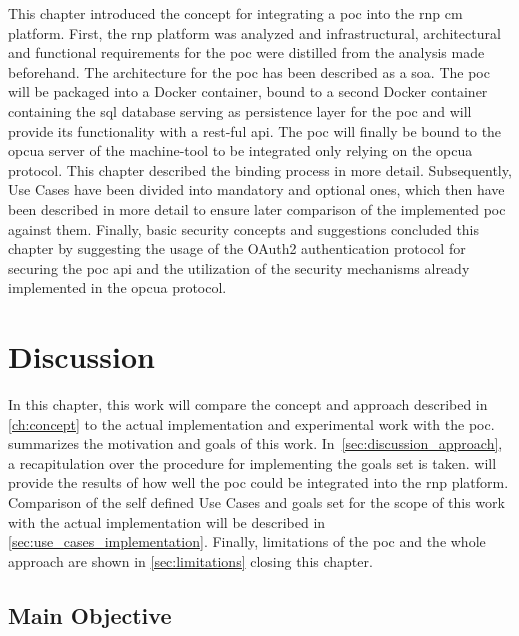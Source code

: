 \documentclass[
a4paper,
twoside,
headsepline,
cleardoublepage=empty,
parskip=half,
draft=false
]{scrbook}
\begin{document}
			This chapter introduced the concept for integrating a \gls{poc} into the \gls{rnp} \gls{cm} platform.
			First, the \gls{rnp} platform was analyzed and infrastructural, architectural and functional requirements for the \gls{poc} were distilled from the analysis made beforehand. 
			The architecture for the \gls{poc} has been described as a \gls{soa}.
			The \gls{poc} will be packaged into a Docker container, bound to a second Docker container containing the \gls{sql} database serving as persistence layer for the \gls{poc} and will provide its functionality with a \gls{rest}-ful \gls{api}.
			The \gls{poc} will finally be bound to the \gls{opcua} server of the machine-tool to be integrated only relying on the \gls{opcua} protocol.
			This chapter described the binding process in more detail.
			Subsequently, Use Cases have been divided into mandatory and optional ones, which then have been described in more detail to ensure later comparison of the implemented \gls{poc} against them.
			Finally, basic security concepts and suggestions concluded this chapter by suggesting the usage of the OAuth2 authentication protocol for securing the \gls{poc} \gls{api} and the utilization of the security mechanisms already implemented in the \gls{opcua} protocol.

	\chapter{Discussion} \label{ch:discusion}

		In this chapter, this work will compare the concept and approach described in \cref{ch:concept} to the actual implementation and experimental work with the \gls{poc}.
		 summarizes the motivation and goals of this work.
		In~\cref{sec:discussion_approach}, a recapitulation over the procedure for implementing the goals set is taken. 
		 will provide the results of how well the \gls{poc} could be integrated into the \gls{rnp} platform. Comparison of the self defined Use Cases and goals set for the scope of this work with the actual implementation will be described in \cref{sec:use_cases_implementation}. Finally, limitations of the \gls{poc} and the whole approach are shown in \cref{sec:limitations} closing this chapter.
		
		\section{Main Objective}\label{sec:main_objective}
		
\end{document}
